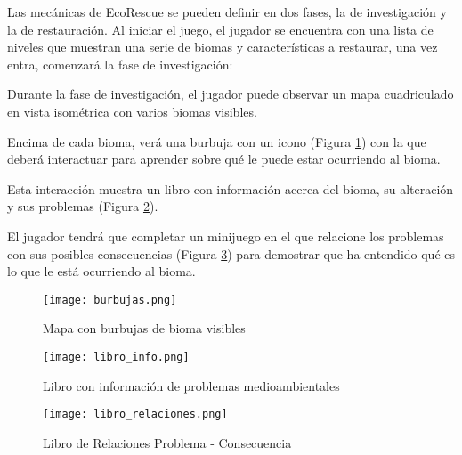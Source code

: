 Las mecánicas de EcoRescue se pueden definir en dos fases, la de investigación y la de restauración. Al iniciar el juego, el jugador se encuentra con una lista de niveles que muestran una serie de biomas y características a restaurar, una vez entra, comenzará la fase de investigación:
\begin{compactitem}
    \item Durante la fase de investigación, el jugador puede observar un mapa cuadriculado en vista isométrica con varios biomas visibles.
    \item Encima de cada bioma, verá una burbuja con un icono (Figura \ref{fig:burbujas}) con la que deberá interactuar para aprender sobre qué le puede estar ocurriendo al bioma.
    \item Esta interacción muestra un libro con información acerca del bioma, su alteración y sus problemas (Figura \ref{fig:libro}).
    \item El jugador tendrá que completar un minijuego en el que relacione los problemas con sus posibles consecuencias (Figura \ref{fig:relations}) para demostrar que ha entendido qué es lo que le está ocurriendo al bioma.
\end{compactitem}

\begin{figure}[H]
  \centering
	\texttt{[image: burbujas.png]}
  \caption{Mapa con burbujas de bioma visibles}
  \label{fig:burbujas}
\end{figure}
\raggedbottom

\begin{figure}[H]
  \centering
	\texttt{[image: libro\_info.png]}
  \caption{Libro con información de problemas medioambientales}
  \label{fig:libro}
\end{figure}

\begin{figure}[H]
  \centering
	\texttt{[image: libro\_relaciones.png]}
  \caption{Libro de Relaciones Problema - Consecuencia}
  \label{fig:relations}
\end{figure}

